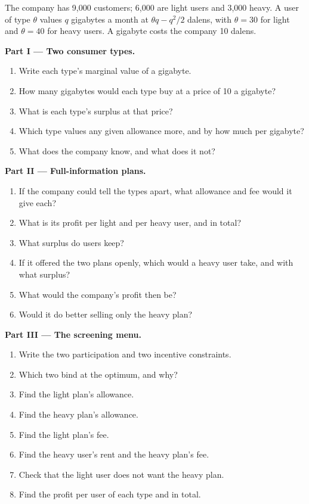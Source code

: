 \begin{problem}
\label{pb:b2:signalling-and-screening:1}
The company has 9{,}000 customers; 6{,}000 are light users and 3{,}000 heavy. A user of type $\theta$ values $q$ gigabytes a month at
$\theta q - q^2/2$ dalens, with $\theta = 30$ for light and $\theta = 40$ for heavy users. A gigabyte costs the company 10 dalens.

\medskip
\noindent\textbf{Part I --- Two consumer types.}
\begin{enumerate}
  \item Write each type's marginal value of a gigabyte.
  \item How many gigabytes would each type buy at a price of 10 a gigabyte?
  \item What is each type's surplus at that price?
  \item Which type values any given allowance more, and by how much per gigabyte?
  \item What does the company know, and what does it not?
\end{enumerate}

\medskip
\noindent\textbf{Part II --- Full-information plans.}
\begin{enumerate}[resume]
  \item If the company could tell the types apart, what allowance and fee would it give each?
  \item What is its profit per light and per heavy user, and in total?
  \item What surplus do users keep?
  \item If it offered the two plans openly, which would a heavy user take, and with what surplus?
  \item What would the company's profit then be?
  \item Would it do better selling only the heavy plan?
\end{enumerate}

\medskip
\noindent\textbf{Part III --- The screening menu.}
\begin{enumerate}[resume]
  \item Write the two participation and two incentive constraints.
  \item Which two bind at the optimum, and why?
  \item Find the light plan's allowance.
  \item Find the heavy plan's allowance.
  \item Find the light plan's fee.
  \item Find the heavy user's rent and the heavy plan's fee.
  \item Check that the light user does not want the heavy plan.
  \item Find the profit per user of each type and in total.
\end{enumerate}


\end{problem}
